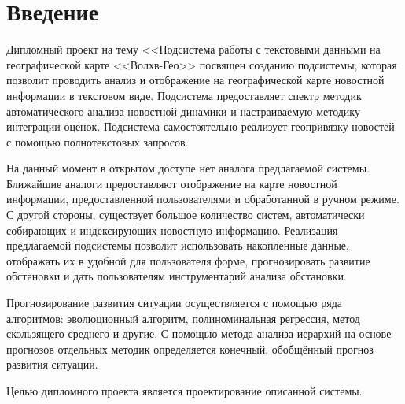 \section*{Введение}

Дипломный проект на тему <<Подсистема работы с текстовыми данными на географической карте <<Волхв-Гео>> посвящен созданию подсистемы, которая позволит проводить анализ и отображение на географической карте новостной информации в текстовом виде. Подсистема предоставляет спектр методик автоматического анализа новостной динамики и настраиваемую методику интеграции оценок. Подсистема самостоятельно реализует геопривязку новостей с помощью полнотекстовых запросов.

На данный момент в открытом доступе нет аналога предлагаемой системы. Ближайшие аналоги предоставляют отображение на карте новостной информации, предоставленной пользователями и обработанной в ручном режиме. С другой стороны, существует большое количество систем, автоматически собирающих и индексирующих новостную информацию. Реализация предлагаемой подсистемы позволит использовать накопленные данные, отображать их в удобной для пользователя форме, прогнозировать развитие обстановки и дать пользователям инструментарий анализа обстановки.

Прогнозирование развития ситуации осуществляется с помощью ряда алгоритмов: эволюционный алгоритм, полиноминальная регрессия, метод скользящего среднего и другие. С помощью метода анализа иерархий на основе прогнозов отдельных методик определяется конечный, обобщённый прогноз развития ситуации.

Целью дипломного проекта является проектирование описанной системы.